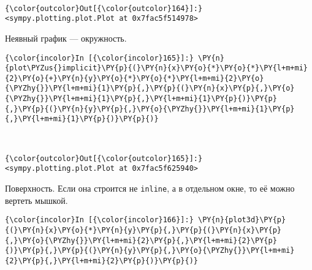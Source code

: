     \begin{center}
    \end{center}
    { \hspace*{\fill} \\}
    
            \begin{Verbatim}[commandchars=\\\{\}]
{\color{outcolor}Out[{\color{outcolor}164}]:} <sympy.plotting.plot.Plot at 0x7fac5f514978>
\end{Verbatim}
        
    Неявный график --- окружность.

    \begin{Verbatim}[commandchars=\\\{\}]
{\color{incolor}In [{\color{incolor}165}]:} \PY{n}{plot\PYZus{}implicit}\PY{p}{(}\PY{n}{x}\PY{o}{*}\PY{o}{*}\PY{l+m+mi}{2}\PY{o}{+}\PY{n}{y}\PY{o}{*}\PY{o}{*}\PY{l+m+mi}{2}\PY{o}{\PYZhy{}}\PY{l+m+mi}{1}\PY{p}{,}\PY{p}{(}\PY{n}{x}\PY{p}{,}\PY{o}{\PYZhy{}}\PY{l+m+mi}{1}\PY{p}{,}\PY{l+m+mi}{1}\PY{p}{)}\PY{p}{,}\PY{p}{(}\PY{n}{y}\PY{p}{,}\PY{o}{\PYZhy{}}\PY{l+m+mi}{1}\PY{p}{,}\PY{l+m+mi}{1}\PY{p}{)}\PY{p}{)}
\end{Verbatim}

    \begin{center}
    \end{center}
    { \hspace*{\fill} \\}
    
            \begin{Verbatim}[commandchars=\\\{\}]
{\color{outcolor}Out[{\color{outcolor}165}]:} <sympy.plotting.plot.Plot at 0x7fac5f625940>
\end{Verbatim}
        
    Поверхность. Если она строится не \texttt{inline}, а в отдельном окне,
то её можно вертеть мышкой.

    \begin{Verbatim}[commandchars=\\\{\}]
{\color{incolor}In [{\color{incolor}166}]:} \PY{n}{plot3d}\PY{p}{(}\PY{n}{x}\PY{o}{*}\PY{n}{y}\PY{p}{,}\PY{p}{(}\PY{n}{x}\PY{p}{,}\PY{o}{\PYZhy{}}\PY{l+m+mi}{2}\PY{p}{,}\PY{l+m+mi}{2}\PY{p}{)}\PY{p}{,}\PY{p}{(}\PY{n}{y}\PY{p}{,}\PY{o}{\PYZhy{}}\PY{l+m+mi}{2}\PY{p}{,}\PY{l+m+mi}{2}\PY{p}{)}\PY{p}{)}
\end{Verbatim}

